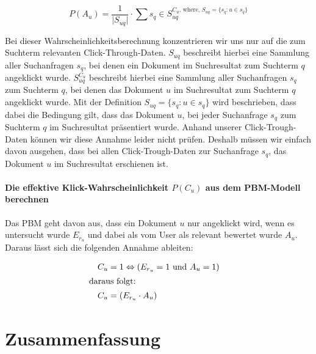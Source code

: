 \vspace{-1.5em}
\begin{equation}	
	P(A_{u}) = \frac{1}{\vert S_{uq} \vert} \cdot \sum{s_q \in S_{uq}^{C_{u}\text{, where, } S_{uq} = \lbrace s_q : u \in s_q \rbrace}}
\end{equation}
\vspace{-1em}

Bei dieser Wahrscheinlichkeitsberechnung konzentrieren wir uns nur auf die zum Suchterm relevanten Click-Through-Daten. $S_{uq}$ beschreibt hierbei eine Sammlung aller Suchanfragen $s_q$, bei denen ein Dokument im Suchresultat zum Suchterm $q$ angeklickt wurde. $S_{uq}^{C_{u}}$ beschreibt hierbei eine Sammlung aller Suchanfragen $s_q$ zum Suchterm $q$, bei denen das Dokument $u$ im Suchresultat zum Suchterm $q$ angeklickt wurde. Mit der Definition $S_{uq} = \lbrace s_q : u \in s_q \rbrace$ wird beschrieben, dass dabei die Bedingung gilt, dass das Dokument $u$, bei jeder Suchanfrage $s_q$ zum Suchterm $q$ im Suchresultat präsentiert wurde. Anhand unserer Click-Trough-Daten können wir diese Annahme leider nicht prüfen. Deshalb müssen wir einfach davon ausgehen, dass bei allen Click-Trough-Daten zur Suchanfrage $s_q$, das Dokument $u$ im Suchresultat erschienen ist. 

\paragraph{Die effektive Klick-Wahrscheinlichkeit $P(C_{u})$ aus dem PBM-Modell berechnen}
Das PBM geht davon aus, dass ein Dokument $u$ nur angeklickt wird, wenn es untersucht wurde $E_{r_{u}}$ und dabei als vom User als relevant bewertet wurde $A_{u}$. Daraus lässt sich die folgenden Annahme ableiten:

\vspace{-.25em}
\begin{spacing}{.25}
\begin{align}
  &&	C_{u} &= 1\Leftrightarrow \left(E_{r_{u}} = 1 \text{ und } A_{u} = 1\right) &\\
  \intertext{daraus folgt:}
  &&	C_{u} &= \left(E_{r_{u}} \cdot A_{u}\right)
\end{align}
\end{spacing}
\vspace{.25em}


\section{Zusammenfassung}
\label{sec:Grundlagen:Zusammenfassung}